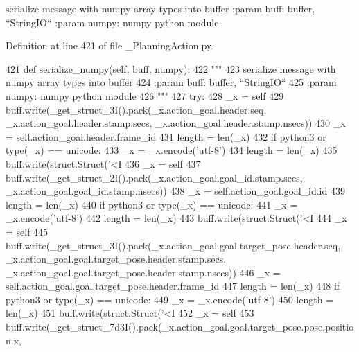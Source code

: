 \begin{DoxyVerb}serialize message with numpy array types into buffer
:param buff: buffer, ``StringIO``
:param numpy: numpy python module
\end{DoxyVerb}
 

Definition at line 421 of file \+\_\+\+Planning\+Action.\+py.


\begin{DoxyCode}
421   \textcolor{keyword}{def }serialize\_numpy(self, buff, numpy):
422     \textcolor{stringliteral}{"""}
423 \textcolor{stringliteral}{    serialize message with numpy array types into buffer}
424 \textcolor{stringliteral}{    :param buff: buffer, ``StringIO``}
425 \textcolor{stringliteral}{    :param numpy: numpy python module}
426 \textcolor{stringliteral}{    """}
427     \textcolor{keywordflow}{try}:
428       \_x = self
429       buff.write(\_get\_struct\_3I().pack(\_x.action\_goal.header.seq, \_x.action\_goal.header.stamp.secs, 
      \_x.action\_goal.header.stamp.nsecs))
430       \_x = self.action\_goal.header.frame\_id
431       length = len(\_x)
432       \textcolor{keywordflow}{if} python3 \textcolor{keywordflow}{or} type(\_x) == unicode:
433         \_x = \_x.encode(\textcolor{stringliteral}{'utf-8'})
434         length = len(\_x)
435       buff.write(struct.Struct(\textcolor{stringliteral}{'<I%
436       \_x = self
437       buff.write(\_get\_struct\_2I().pack(\_x.action\_goal.goal\_id.stamp.secs, 
      \_x.action\_goal.goal\_id.stamp.nsecs))
438       \_x = self.action\_goal.goal\_id.id
439       length = len(\_x)
440       \textcolor{keywordflow}{if} python3 \textcolor{keywordflow}{or} type(\_x) == unicode:
441         \_x = \_x.encode(\textcolor{stringliteral}{'utf-8'})
442         length = len(\_x)
443       buff.write(struct.Struct(\textcolor{stringliteral}{'<I%
444       \_x = self
445       buff.write(\_get\_struct\_3I().pack(\_x.action\_goal.goal.target\_pose.header.seq, 
      \_x.action\_goal.goal.target\_pose.header.stamp.secs, \_x.action\_goal.goal.target\_pose.header.stamp.nsecs))
446       \_x = self.action\_goal.goal.target\_pose.header.frame\_id
447       length = len(\_x)
448       \textcolor{keywordflow}{if} python3 \textcolor{keywordflow}{or} type(\_x) == unicode:
449         \_x = \_x.encode(\textcolor{stringliteral}{'utf-8'})
450         length = len(\_x)
451       buff.write(struct.Struct(\textcolor{stringliteral}{'<I%
452       \_x = self
453       buff.write(\_get\_struct\_7d3I().pack(\_x.action\_goal.goal.target\_pose.pose.position.x, 
}}}
\end{DoxyCode}
